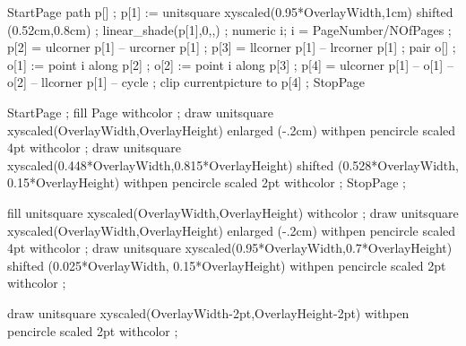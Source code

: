 \startmode[stripemode]
StartPage
path p[] ;
p[1] := unitsquare xyscaled(0.95*OverlayWidth,1cm) shifted (0.52cm,0.8cm) ;
linear_shade(p[1],0,,) ;
numeric i; i = PageNumber/NOfPages ;
p[2] = ulcorner p[1] -- urcorner p[1] ;
p[3] = llcorner p[1] -- lrcorner p[1] ;
pair o[] ;
o[1] := point i along p[2] ;
o[2] := point i along p[3] ;
p[4] = ulcorner p[1] -- o[1] -- o[2] -- llcorner p[1] -- cycle ;
clip currentpicture to p[4] ;
StopPage
\stopuseMPgraphic
\stopmode

StartPage ;
fill Page withcolor  ; 
draw unitsquare 
xyscaled(OverlayWidth,OverlayHeight) 
enlarged (-.2cm) 
withpen pencircle scaled 4pt 
withcolor  ; 
draw unitsquare 
xyscaled(0.448*OverlayWidth,0.815*OverlayHeight) 
shifted (0.528*OverlayWidth, 0.15*OverlayHeight)
withpen pencircle scaled 2pt 
withcolor  ; 
StopPage ;
\stopuniqueMPgraphic 

fill unitsquare 
xyscaled(OverlayWidth,OverlayHeight) 
withcolor  ; 
draw unitsquare 
xyscaled(OverlayWidth,OverlayHeight) 
enlarged (-.2cm) 
withpen pencircle scaled 4pt 
withcolor  ; 
draw unitsquare 
xyscaled(0.95*OverlayWidth,0.7*OverlayHeight) 
shifted (0.025*OverlayWidth, 0.15*OverlayHeight)
withpen pencircle scaled 2pt 
withcolor  ; 
\stopuniqueMPgraphic 

draw unitsquare xyscaled(OverlayWidth-2pt,OverlayHeight-2pt)
withpen pencircle scaled 2pt
withcolor  ;
\stopuniqueMPgraphic







\lecback{\setupbackgrounds[page][background={lecbackground,bottom,slidetitle}]\setuplayout[backspace=1cm,header=2.1cm]}
\titback{\setupbackgrounds[page][background=lecbackground]\setuplayout[backspace=1cm]}
\picback{\setupbackgrounds[page][background={picbackground,bottom}]\setuplayout[backspace=0.5cm,header=0cm]}
\noback{\setupbackgrounds[page][background=nobackground]}


\setupcombinations[distance=1.1cm]


\setupitemize[color=One]

\protect
\stopmodule

\endinput

